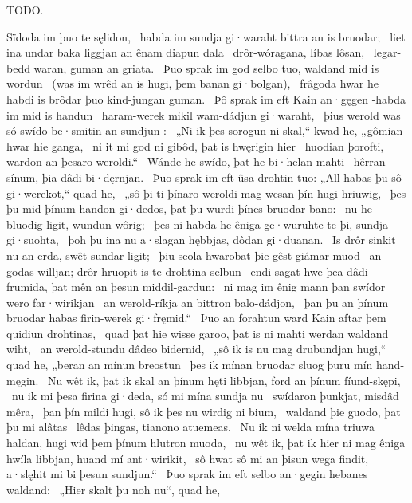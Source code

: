 \bvb TODO.\evb\evg

\sectionline

\bvg\bva%
Sïdoda im þuo te sęlidon, \hld\ habda im sundja gi·waraht
bittra an is bruodar; \hld\ liet ina undar baka liggjan
an ênam diapun dala \hld\ drôr-wóragana,
líbas lôsan, \hld\ legar-bedd waran,
guman an griata. \hld\ Þuo sprak im god selbo tuo,
waldand mid is wordun \hld\ (was im wrêd an is hugi,
þem banan gi·bolgan), \hld\ frâgoda hwar he habdi is brôdar þuo
kind-jungan guman. \hld\ Þô sprak im eft Kain an·gęgen
-habda im mid is handun \hld\ haram-werek mikil
wam-dádjun gi·waraht, \hld\ þius werold was só swído
be·smitin an sundjun-: \hld\ „Ni ik þes sorogun ni skal,“ kwad he,
„gômian hwar hie ganga, \hld\ ni it mi god ni gibôd,
þat is hwęrigin hier \hld\ huodian þorofti,
wardon an þesaro weroldi.“ \hld\ Wánde he swído,
þat he bi·helan mahti \hld\ hêrran sínum,
þia dâdi bi·dęrnjan. \hld\ Þuo sprak im eft ûsa drohtin tuo:
„All habas þu sô gi·werekot,“ quad he, \hld\ „sô þi ti þínaro weroldi mag
wesan þín hugi hriuwig, \hld\ þes þu mid þínum handon gi·dedos,
þat þu wurdi þínes bruodar bano: \hld\ nu he bluodig ligit,
wundun wôrig; \hld\ þes ni habda he êniga ge·wuruhte te þi,
sundja gi·suohta, \hld\ þoh þu ina nu a·slagan hębbjas,
dôdan gi·duanan. \hld\ Is drôr sinkit nu an erda,
swêt sundar ligit; \hld\ þiu seola hwarobat
þie gêst giámar-muod \hld\ an godas willjan;
drôr hruopit is te drohtina selbun \hld\ endi sagat hwe þea dâdi frumida,
þat mên an þesun middil-gardun: \hld\ ni mag im ênig mann þan swídor
wero far·wirikjan \hld\ an werold-ríkja
an bittron balo-dádjon, \hld\ þan þu an þínum bruodar habas
firin-werek gi·fręmid.“ \hld\ Þuo an forahtun ward
Kain aftar þem quidiun drohtinas, \hld\ quad þat hie wisse garoo,
þat is ni mahti werdan waldand wiht, \hld\ an werold-stundu
dâdeo bidernid, \hld\ „sô ik is nu mag drubundjan hugi,“ quad he,
„beran an mínun breostun \hld\ þes ik mínan bruodar sluog
þuru mín hand-męgin. \hld\ Nu wêt ik, þat ik skal an þínum hęti libbjan,
ford an þínum fíund-skępi, \hld\ nu ik mi þesa firina gi·deda,
só mi mína sundja nu \hld\ swídaron þunkjat,
misdâd mêra, \hld\ þan þín mildi hugi,
sô ik þes nu wirdig ni bium, \hld\ waldand þie guodo,
þat þu mi alâtas \hld\ lêdas þingas,
tianono atuemeas. \hld\ Nu ik ni welda mína triuwa haldan,
hugi wid þem þínum hlutron muoda, \hld\ nu wêt ik, þat ik hier ni mag êniga hwíla libbjan,
huand mí ant·wirikit, \hld\ sô hwat sô mi an þisun wega findit,
a·slęhit mi bi þesun sundjun.“ \hld\ Þuo sprak im eft selbo an·gegin
hebanes waldand: \hld\ „Hier skalt þu noh nu“, quad he,
